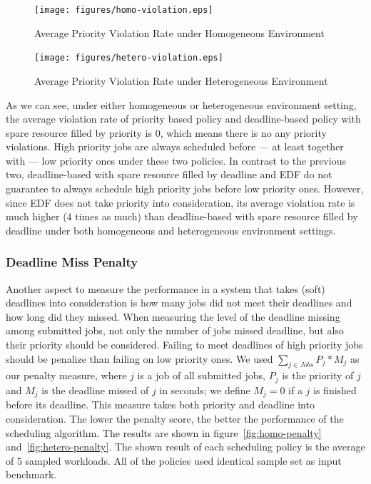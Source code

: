 \begin{figure}[htbp]
  \centering
  \texttt{[image: figures/homo-violation.eps]}
  \caption{Average Priority Violation Rate under Homogeneous Environment}
  \label{fig:homo-violation}
\end{figure}

\begin{figure}[htbp]
  \centering
  \texttt{[image: figures/hetero-violation.eps]}
  \caption{Average Priority Violation Rate under Heterogeneous Environment}
  \label{fig:hetero-violation}
\end{figure}

As we can see, under either homogeneous or heterogeneous environment
setting, the average violation rate of priority based policy and
deadline-based policy with spare resource filled by priority is 0, which
means there is no any priority violations.
High priority jobs are always scheduled before --- at least together
with --- low priority ones under these two policies.
In contrast to the previous two, deadline-based with spare resource
filled by deadline and EDF do not guarantee to always schedule high
priority jobs before low priority ones.
However, since EDF does not take priority into consideration, its
average violation rate is much higher (4 times as much) than
deadline-based with spare resource filled by deadline under both
homogeneous and heterogeneous environment settings.

\subsubsection{Deadline Miss Penalty}

Another aspect to measure the performance in a system that takes (soft)
deadlines into consideration is how many jobs did not meet their
deadlines and how long did they missed.
When measuring the level of the deadline missing among submitted jobs,
not only the number of jobs missed deadline, but also their priority
should be considered.
Failing to meet deadlines of high priority jobs should be penalize than
failing on low priority ones.
We used $\sum_{j \in Jobs} P_j * M_j$ as our penalty measure, where $j$
is a job of all submitted jobs, $P_j$ is the priority of $j$ and $M_j$
is the deadline missed of $j$ in seconds; we define $M_j = 0$ if a $j$
is finished before its deadline.
This measure takes both priority and deadline into consideration.
The lower the penalty score, the better the performance of the
scheduling algorithm.
The results are shown in figure~\ref{fig:homo-penalty}
and~\ref{fig:hetero-penalty}.
The shown result of each scheduling policy is the average of 5 sampled
workloads.
All of the policies used identical sample set as input benchmark.

